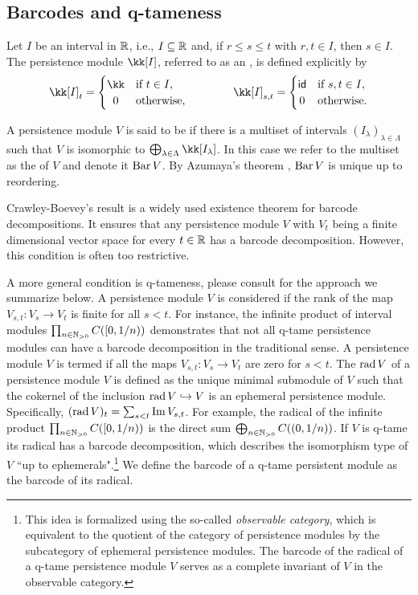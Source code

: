 \subsection{Barcodes and q-tameness}

Let $I$ be an interval in $\mathbb{R}$, i.e., $I \subseteq \mathbb{R}$ and, if $r \leq s \leq t$ with $r, t \in I$, then $s \in I$.
The persistence module $\kk[I]$, referred to as an , is defined explicitly by
\[
\kk[I]_t =
\begin{cases}
	\kk & \text{if } t \in I, \\
	\hfil 0 & \text{otherwise},
\end{cases}
\qquad \qquad
\kk[I]_{s, t} =
\begin{cases}
	\id & \text{if } s, t \in I, \\
	\hfil 0 & \text{otherwise}.
\end{cases}
\]

A persistence module $V$ is said to be  if there is a multiset of intervals $(I_\lambda)_{\lambda \in \Lambda}$ such that $V$ is isomorphic to $\bigoplus_{\lambda \in \Lambda} \kk[I_\lambda]$.
In this case we refer to the multiset as the  of $V$ and denote it $\operatorname{Bar} V$.
By Azumaya’s theorem \cite{azumaya1950theorem}, $\operatorname{Bar} V$ is unique up to reordering.

Crawley-Boevey's result \cite{Crawley-Boevey.2015} is a widely used existence theorem for barcode decompositions.
It ensures that any persistence module \(V\) with \(V_t\) being a finite dimensional vector space for every \(t \in \mathbb{R}\) has a barcode decomposition.
However, this condition is often too restrictive.

A more general condition is q-tameness, please consult \cite{Chazal.2016a, Chazal.2016b} for the approach we summarize below.
A persistence module \(V\) is considered  if the rank of the map \(V_{s,t} \colon V_s \to V_t\) is finite for all \(s < t\).
For instance, the infinite product of interval modules \(\prod_{n \in \mathbb{N}_{> 0}} C([0,1/n))\) demonstrates that not all q-tame persistence modules can have a barcode decomposition in the traditional sense.
A persistence module \(V\) is termed  if all the maps \(V_{s,t} \colon V_s \to V_t\) are zero for \(s < t\).
The  \(\operatorname{rad} V\) of a persistence module \(V\) is defined as the unique minimal submodule of \(V\) such that the cokernel of the inclusion \(\operatorname{rad} V \hookrightarrow V\) is an ephemeral persistence module.
Specifically, \((\operatorname{rad} V)_t = \sum_{s<t} \operatorname{Im} V_{s,t}\).
For example, the radical of the infinite product \(\prod_{n \in \mathbb{N}_{> 0}} C([0, 1/n))\) is the direct sum \(\bigoplus_{n \in \mathbb{N}_{> 0}} C((0,1/n))\).
If \(V\) is q-tame its radical has a barcode decomposition, which describes the isomorphism type of \(V\) ``up to ephemerals".\footnote{
This idea is formalized using the so-called \textit{observable category}, which is equivalent to the quotient of the category of persistence modules by the subcategory of ephemeral persistence modules.
The barcode of the radical of a q-tame persistence module \(V\) serves as a complete invariant of \(V\) in the observable category.}
We define the barcode of a q-tame persistent module as the barcode of its radical.

